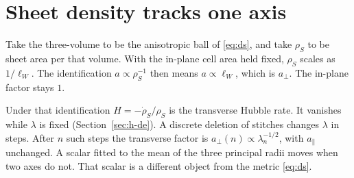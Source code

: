 \section{Sheet density tracks one axis}
\label{sec:h-rhos}

Take the three-volume to be the anisotropic ball of \eqref{eq:ds}, and
take \(\rho_S\) to be sheet area per that volume.
With the in-plane cell area held fixed, \(\rho_S\) scales as \(1/\ell_W\).
The identification \(a\propto\rho_S^{-1}\) then means \(a\propto\ell_W\),
which is \(a_\perp\).
The in-plane factor stays \(1\).

Under that identification
\(H=-\dot\rho_S/\rho_S\) is the transverse Hubble rate.
It vanishes while \(\lambda\) is fixed (Section~\ref{sec:h-de}).
A discrete deletion of stitches changes \(\lambda\) in steps.
After \(n\) such steps the transverse factor is
\(a_\perp(n)\propto\lambda_n^{-1/2}\), with \(a_\parallel\) unchanged.
A scalar fitted to the mean of the three principal radii moves when two
axes do not.
That scalar is a different object from the metric \eqref{eq:ds}.
